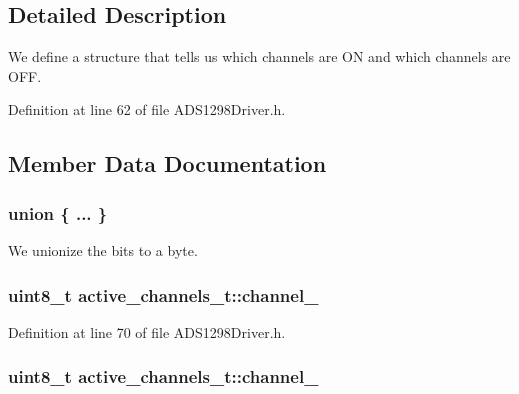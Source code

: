 \subsection{\-Detailed \-Description}
\-We define a structure that tells us which channels are \-O\-N and which channels are \-O\-F\-F. 

\-Definition at line 62 of file \-A\-D\-S1298\-Driver.\-h.



\subsection{\-Member \-Data \-Documentation}
\hypertarget{structactive__channels__t_a112624bc0328b62e6b73bb4dc1fe4c8f}{\subsubsection[{"@1}]{\setlength{\rightskip}{0pt plus 5cm}union \{ ... \} }}\label{structactive__channels__t_a112624bc0328b62e6b73bb4dc1fe4c8f}


\-We unionize the bits to a byte. 

\hypertarget{structactive__channels__t_aa5ca3c312df986cbdd27521862898ea2}{
\subsubsection[{channel\-\_\-1}]{\setlength{\rightskip}{0pt plus 5cm}uint8\-\_\-t {\bf active\-\_\-channels\-\_\-t\-::channel\-\_}}}\label{structactive__channels__t_aa5ca3c312df986cbdd27521862898ea2}


\-Definition at line 70 of file \-A\-D\-S1298\-Driver.\-h.

\hypertarget{structactive__channels__t_abc7078c4e6fa549941ff3e0d2fb1e2f4}{
\subsubsection[{channel\-\_\-2}]{\setlength{\rightskip}{0pt plus 5cm}uint8\-\_\-t {\bf active\-\_\-channels\-\_\-t\-::channel\-\_}}}\label{structactive__channels__t_abc7078c4e6fa549941ff3e0d2fb1e2f4}


